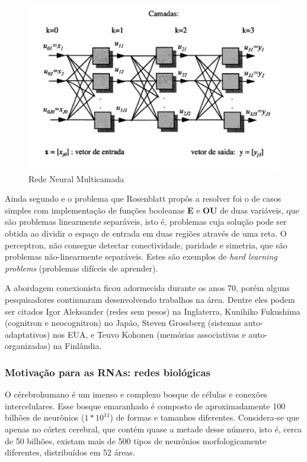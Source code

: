 \documentclass[
	12pt,				%
	openright,			%
	twoside,			%
	a4paper,			%
	english,			%
	french,				%
	spanish,			%
	brazil				%
	]{abntex2}
\begin{document}
\begin{figure}[htb]
	\caption{\label{fig_rede_multicamada}Rede Neural Multicamada}
	\begin{center}
	    \includegraphics[scale=0.7]{imagens/rede_neural_multicamada.pdf}
	\end{center}
\end{figure}

Ainda segundo  e  o problema que Rosenblatt propôs a resolver foi o de casos simples com implementação de funções booleanas \textbf{E} e \textbf{OU} de duas variáveis, que são problemas linearmente separáveis, isto é, problemas cuja solução pode ser obtida ao dividir o espaço de entrada em duas regiões através de uma reta. O perceptron, não consegue detectar conectividade, paridade e simetria, que são problemas não-linearmente separáveis. Estes são exemplos de \textit{hard learning problems} (problemas difíceis de aprender).

A abordagem conexionista ficou adormecida durante os anos 70, porém alguns pesquisadores continuaram desenvolvendo trabalhos na área. Dentre eles podem ser citados Igor Aleksander (redes sem pesos) na Inglaterra, Kunihiko Fukushima (cognitron e neocognitron) no Japão, Steven Grossberg (sistemas auto-adaptativos) nos EUA, e Teuvo Kohonen (memórias associativas e auto-organizadas) na Finlândia.
\subsubsection{Motivação para as RNAs: redes biológicas}
O cérebrohumano é um imenso e complexo bosque de células e conexões intercelulares. Esse bosque emaranhado é composto de aproximadamente 100 bilhões de neurônios ($ 1 * 10^{11}$) de formas e tamanhos diferentes. Considera-se que apenas no córtex cerebral, que contém quase a metade desse número, isto é, cerca de 50 bilhões, existam mais de 500 tipos de neurônios morfologicamente diferentes, distribuídos em 52 áreas.\cite[p.18]{mora2016continuum} 
\end{document}
